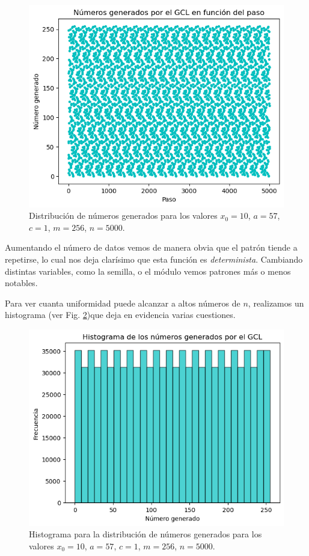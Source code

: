 \documentclass[baaa]{baaa}
\begin{document}
\begin{figure}[!h]
    \centering
    \includegraphics[width=0.9\linewidth]{imagenes/gclz5000.png}
    \caption{Distribución de números generados para los valores $x_0=10$, $a=57$, $c=1$, $m=256$, $n=5000$.}
    \label{gclz5000}
\end{figure}

Aumentando el número de datos vemos de manera obvia que el patrón tiende a repetirse, lo cual nos deja clarísimo que esta función es \textit{determinista}. Cambiando distintas variables, como la semilla, o el módulo vemos patrones más o menos notables.

Para ver cuanta uniformidad puede alcanzar a altos números de $n$, realizamos un histograma (ver Fig. \ref{histogclz5000})que deja en evidencia varias cuestiones.

\begin{figure}[!h]
    \centering
    \includegraphics[width=0.9\linewidth]{imagenes/histogclz5000.png}
    \caption{Histograma para la distribución de números generados para los valores $x_0=10$, $a=57$, $c=1$, $m=256$, $n=5000$.}
    \label{histogclz5000}
\end{figure}
\end{document}
